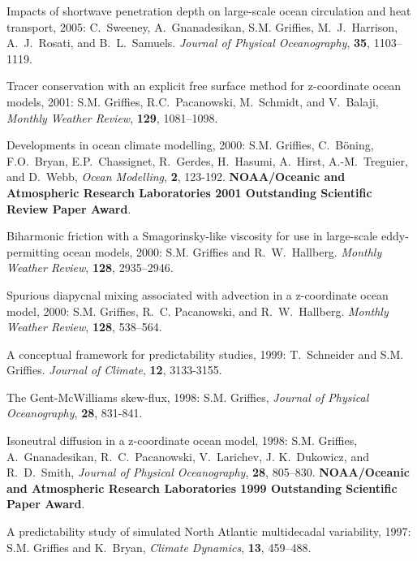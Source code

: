 \begin{etaremune}
\item Impacts of shortwave penetration depth on large-scale ocean
circulation and heat transport, 2005: C.\ Sweeney, A.\ Gnanadesikan,
S.M. Grif\/f\/ies, M.\ J.\ Harrison, A.\ J.\ Rosati, and B.\
L.\ Samuels.  {\em Journal of Physical Oceanography}, {\bf 35},
1103--1119.

\item Tracer conservation with an explicit free surface method for
  z-coordinate ocean models, 2001: 
  S.M. Grif\/f\/ies, R.C.\
  Pacanowski, M.\ Schmidt, and V.\ Balaji, {\em Monthly Weather
    Review}, {\bf 129}, 1081--1098.

\item Developments in ocean climate modelling, 2000:  S.M. Grif\/f\/ies, C.\ B\"oning, F.O.\ Bryan, E.P.\ Chassignet, R.\
  Gerdes, H.\ Hasumi, A.\ Hirst, A.-M.\ Treguier, and D.\ Webb, {\em
    Ocean Modelling}, {\bf 2}, 123-192.  {\bf 
    NOAA/Oceanic and Atmospheric Research Laboratories 2001
    Outstanding Scientific Review Paper Award}.

\item Biharmonic friction with a  Smagorinsky-like viscosity for use in large-scale eddy-permitting ocean models, 2000:
S.M. Grif\/f\/ies and R.\ W.\ Hallberg.  {\em Monthly Weather
Review}, {\bf 128}, 2935--2946.

\item Spurious diapycnal mixing associated with advection in a z-coordinate ocean model, 2000: S.M. Grif\/f\/ies, R.\ C. Pacanowski, and R.\ W.\ Hallberg. {\em Monthly Weather Review}, {\bf
128}, 538--564.

\item A conceptual framework for predictability studies, 1999: T.\ 
Schneider and S.M. Grif\/f\/ies.  {\em Journal of Climate},
{\bf 12}, 3133-3155.
  
\item The Gent-McWilliams skew-flux, 1998:
S.M. Grif\/f\/ies, {\em Journal of Physical Oceanography}, {\bf 28}, 831-841.
  
\item Isoneutral diffusion in a z-coordinate ocean model, 1998: S.M. Grif\/f\/ies, A.\ Gnanadesikan, R.\ C.\ Pacanowski, V.\
  Larichev, J. K.\ Dukowicz, and R.\ D.\ Smith, {\em Journal of
    Physical Oceanography}, {\bf 28}, 805--830.  {\bf
    NOAA/Oceanic and Atmospheric Research Laboratories 1999
    Outstanding Scientific Paper Award}.
  
\item A predictability study of simulated North Atlantic multidecadal
variability, 1997: S.M. Grif\/f\/ies and K.\ Bryan, {\em
Climate Dynamics}, {\bf 13}, 459--488.
  

\end{etaremune}
